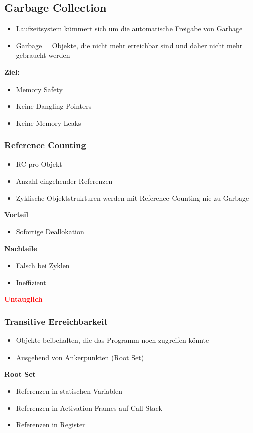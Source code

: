 \subsection{Garbage Collection}
\begin{itemize}
    \item Laufzeitsystem kümmert sich um die automatische Freigabe von Garbage
    \item Garbage = Objekte, die nicht mehr erreichbar sind und daher nicht mehr gebraucht werden
\end{itemize}
\textbf{Ziel:}
\begin{itemize}
    \item Memory Safety
    \item Keine Dangling Pointers
    \item Keine Memory Leaks
\end{itemize}

\subsubsection{Reference Counting}
\begin{itemize}
    \item RC pro Objekt
    \item Anzahl eingehender Referenzen
    \item Zyklische Objektstrukturen werden mit Reference Counting nie zu Garbage
\end{itemize}
\textbf{Vorteil}
\begin{itemize}
    \item Sofortige Deallokation
\end{itemize}
\textbf{Nachteile}
\begin{itemize}
    \item Falsch bei Zyklen
    \item Ineffizient
\end{itemize}
\textbf{\textcolor{red}{Untauglich}}

\subsubsection{Transitive Erreichbarkeit}
\begin{itemize}
    \item Objekte beibehalten, die das Programm noch zugreifen könnte
    \item Ausgehend von Ankerpunkten (Root Set)
\end{itemize}
\textbf{Root Set}
\begin{itemize}
    \item Referenzen in statischen Variablen
    \item Referenzen in Activation Frames auf Call Stack
    \item Referenzen in Register
\end{itemize}

